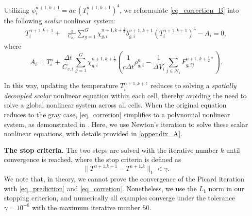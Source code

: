 \documentclass[preprint,12pt]{elsarticle}
\theoremstyle{definition}
\theoremstyle{plain}
\numberwithin{equation}{section}
\numberwithin{algorithm}{section}
\newcounter{eq_count}
\newcommand{\half}{\frac{1}{2}}
\begin{document}
    	Utilizing $\phi_i^{n+1,k+1} = ac \, (T_i^{n+1,k+1})^4$, we reformulate \eqref{eq_correction_B} into the following \textit{scalar} nonlinear system:
    	\begin{equation}\label{eq_corretion}
    		\begin{aligned}
    			T_i^{n+1,k+1} +& \frac{ a}{C_{v,i}} \sum_{g=1}^G \chi_{g,i}^{n+1, k+ \half}  b_{g,i}^{n+1, k+1} (T_i^{n+1,k+1})^4  - A_i =0,
    		\end{aligned}
    	\end{equation}
    	where 
    	\begin{equation*}
    		A_i = T_i^n + \frac{\Delta t}{C_{v,i}} \sum_{g=1}^G \chi_{g,i}^{n+1, k+ \half}\left( \frac{1}{c \Delta t} \rho_{g,i}^n- \frac{1}{\Delta V_i}  \sum_{j \in \mathcal{N}_i} 
    		 F_{g,ij}^{n+1,k+\half*} \right).
    	\end{equation*}
    	
    	In this way, updating the temperature $T_i^{n+1,k+1}$ reduces to solving a \textit{spatially decoupled scalar} nonlinear equation within each cell, thereby avoiding the need to solve a global nonlinear system across all cells. 
    	When the original equation reduces to the gray case, \eqref{eq_corretion} simplifies to a polynomial nonlinear system, as  demonstrated in \cite{xiong2022high,tang2021accurate}. Here, we use Newton's iteration to solve these scalar nonlinear equations, with details provided in \ref{appendix_A}.
    	
    	\textbf{The stop criteria.}
    	The two steps are solved with the iterative number $k$ until convergence is reached, where the stop criteria is defined as
    	\begin{equation} \label{eq_stop_criteria}
    		\| T^{n+1.k+1} - T^{n+1.k} \|_1 < \gamma.
    	\end{equation}
    	We note that, in theory, we cannot prove the convergence of the Picard iteration with 
    	\eqref{eq_prediction} and \eqref{eq_corretion}. Nonetheless, we use the $L_1$ norm in our stopping criterion, and numerically all examples converge under the tolerance $\gamma = 10^{-8}$ with the maximum iterative number $50$.

    
\end{document}
